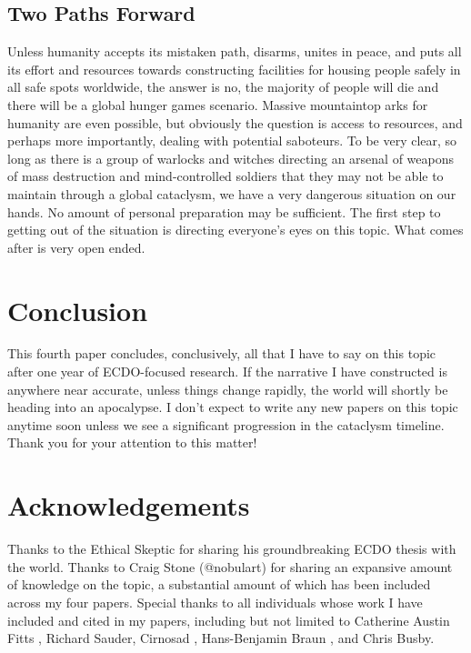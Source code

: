 \documentclass[10pt,twocolumn,letterpaper]{article}
\begin{document}
\subsection{Two Paths Forward}

Unless humanity accepts its mistaken path, disarms, unites in peace, and puts all its effort and resources towards constructing facilities for housing people safely in all safe spots worldwide, the answer is no, the majority of people will die and there will be a global hunger games scenario. Massive mountaintop arks for humanity are even possible, but obviously the question is access to resources, and perhaps more importantly, dealing with potential saboteurs. To be very clear, so long as there is a group of warlocks and witches directing an arsenal of weapons of mass destruction and mind-controlled soldiers that they may not be able to maintain through a global cataclysm, we have a very dangerous situation on our hands. No amount of personal preparation may be sufficient. The first step to getting out of the situation is directing everyone's eyes on this topic. What comes after is very open ended.

\section{Conclusion}

This fourth paper concludes, conclusively, all that I have to say on this topic after one year of ECDO-focused research. If the narrative I have constructed is anywhere near accurate, unless things change rapidly, the world will shortly be heading into an apocalypse. I don't expect to write any new papers on this topic anytime soon unless we see a significant progression in the cataclysm timeline. Thank you for your attention to this matter!

\section{Acknowledgements}

Thanks to the Ethical Skeptic \cite{0} for sharing his groundbreaking ECDO thesis with the world. Thanks to Craig Stone (@nobulart) \cite{56} for sharing an expansive amount of knowledge on the topic, a substantial amount of which has been included across my four papers. Special thanks to all individuals whose work I have included and cited in my papers, including but not limited to Catherine Austin Fitts \cite{55}, Richard Sauder, Cirnosad \cite{24}, Hans-Benjamin Braun \cite{57}, and Chris Busby.
\end{document}
